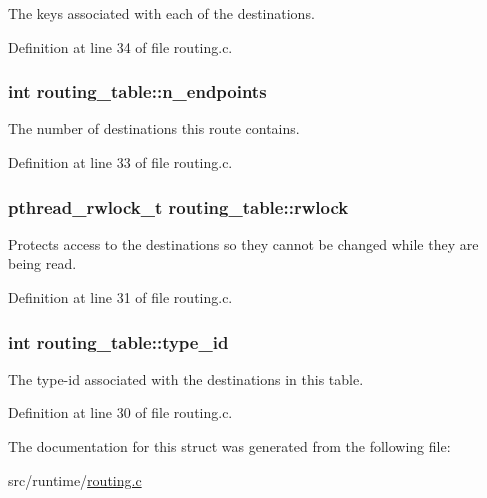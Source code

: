 The keys associated with each of the destinations. 



Definition at line 34 of file routing.\-c.

\hypertarget{structrouting__table_a7d9a6d626a79a44bb58533c97ac9e7ce}{
\subsubsection[{n\-\_\-endpoints}]{\setlength{\rightskip}{0pt plus 5cm}int routing\-\_\-table\-::n\-\_\-endpoints}}\label{structrouting__table_a7d9a6d626a79a44bb58533c97ac9e7ce}


The number of destinations this route contains. 



Definition at line 33 of file routing.\-c.

\hypertarget{structrouting__table_acbdb86bbcf769654f18ad6b2bb6c61c4}{
\subsubsection[{rwlock}]{\setlength{\rightskip}{0pt plus 5cm}pthread\-\_\-rwlock\-\_\-t routing\-\_\-table\-::rwlock}}\label{structrouting__table_acbdb86bbcf769654f18ad6b2bb6c61c4}


Protects access to the destinations so they cannot be changed while they are being read. 



Definition at line 31 of file routing.\-c.

\hypertarget{structrouting__table_a439ad2d1ec8a9d942bc3db95b02ea1a0}{
\subsubsection[{type\-\_\-id}]{\setlength{\rightskip}{0pt plus 5cm}int routing\-\_\-table\-::type\-\_\-id}}\label{structrouting__table_a439ad2d1ec8a9d942bc3db95b02ea1a0}


The type-\/id associated with the destinations in this table. 



Definition at line 30 of file routing.\-c.



The documentation for this struct was generated from the following file\-:\begin{DoxyCompactItemize}
\item 
src/runtime/\hyperlink{routing_8c}{routing.\-c}\end{DoxyCompactItemize}
